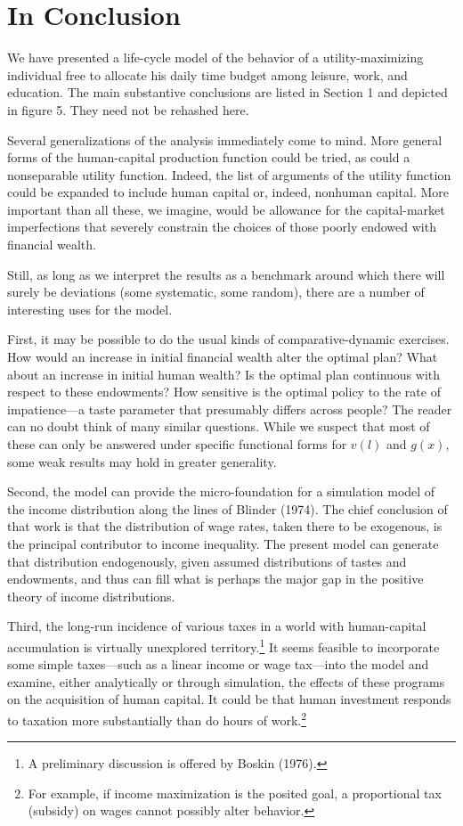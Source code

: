 \documentclass[11pt,fleqn]{article}
\begin{document}
\section{In Conclusion}

We have presented a life-cycle model of the behavior of a utility-maximizing individual free to allocate his daily time budget among leisure, work, and education. The main substantive conclusions are listed in Section 1 and depicted in figure 5. They need not be rehashed here.

Several generalizations of the analysis immediately come to mind. More general forms of the human-capital production function could be tried, as could a nonseparable utility function. Indeed, the list of arguments of the utility function could be expanded to include human capital or, indeed, nonhuman capital. More important than all these, we imagine, would be allowance for the capital-market imperfections that severely constrain the choices of those poorly endowed with financial wealth.

Still, as long as we interpret the results as a benchmark around which there will surely be deviations (some systematic, some random), there are a number of interesting uses for the model.

First, it may be possible to do the usual kinds of comparative-dynamic exercises. How would an increase in initial financial wealth alter the optimal plan? What about an increase in initial human wealth? Is the optimal plan continuous with respect to these endowments? How sensitive is the optimal policy to the rate of impatience---a taste parameter that presumably differs across people? The reader can no doubt think of many similar questions. While we suspect that most of these can only be answered under specific functional forms for $v(l)$ and $g(x)$, some weak results may hold in greater generality.

Second, the model can provide the micro-foundation for a simulation model of the income distribution along the lines of Blinder (1974). The chief conclusion of that work is that the distribution of wage rates, taken there to be exogenous, is the principal contributor to income inequality. The present model can generate that distribution endogenously, given assumed distributions of tastes and endowments, and thus can fill what is perhaps the major gap in the positive theory of income distributions.

Third, the long-run incidence of various taxes in a world with human-capital accumulation is virtually unexplored territory.\footnote{A preliminary discussion is offered by Boskin (1976).} It seems feasible to incorporate some simple taxes---such as a linear income or wage tax---into the model and examine, either analytically or through simulation, the effects of these programs on the acquisition of human capital. It could be that human investment responds to taxation more substantially than do hours of work.\footnote{For example, if income maximization is the posited goal, a proportional tax (subsidy) on wages cannot possibly alter behavior.}
\end{document}
